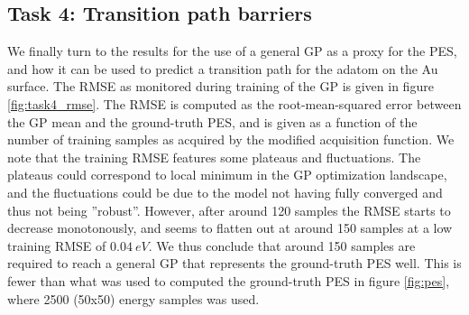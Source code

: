 \documentclass[11pt,a4paper]{article}
\begin{document}
\subsection[Task 4]{Task 4: Transition path barriers}
\label{sec:results_task4}

We finally turn to the results for the use of a general GP as a proxy for the PES, and how it can be used to predict a transition path for the adatom on the Au surface. The RMSE as monitored during training of the GP is given in figure \ref{fig:task4_rmse}. The RMSE is computed as the root-mean-squared error between the GP mean and the ground-truth PES, and is given as a function of the number of training samples as acquired by the modified acquisition function. We note that the training RMSE features some plateaus and fluctuations. The plateaus could correspond to local minimum in the GP optimization landscape, and the fluctuations could be due to the model not having fully converged and thus not being ''robust''. However, after around 120 samples the RMSE starts to decrease monotonously, and seems to flatten out at around 150 samples at a low training RMSE of $\SI{0.04}{eV}$. We thus conclude that around 150 samples are required to reach a general GP that represents the ground-truth PES well. This is fewer than what was used to computed the ground-truth PES in figure \ref{fig:pes}, where 2500 (50x50) energy samples was used.
\end{document}

